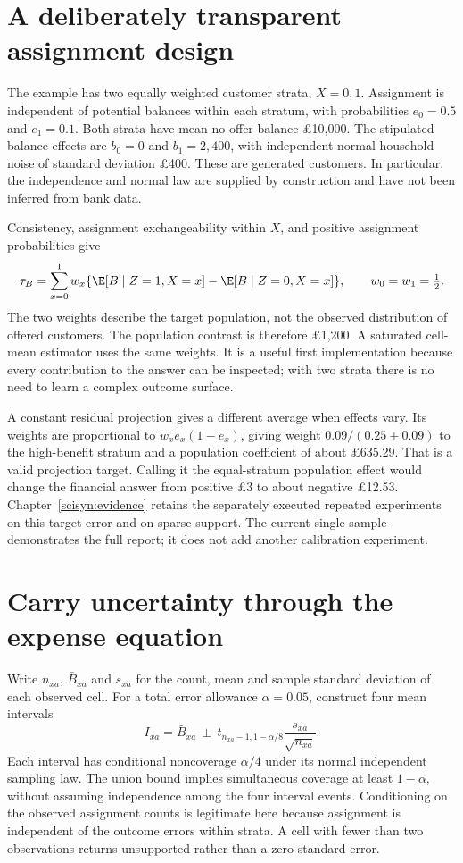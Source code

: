 \section{A deliberately transparent assignment design}
The example has two equally weighted customer strata, $X=0,1$. Assignment is
independent of potential balances within each stratum, with probabilities
$e_0=0.5$ and $e_1=0.1$. Both strata have mean no-offer balance
\pounds10,000. The stipulated balance effects are $b_0=0$ and $b_1=2,400$,
with independent normal household noise of standard deviation \pounds400.
These are generated customers. In particular, the independence and normal
law are supplied by construction and have not been inferred from bank data.

Consistency, assignment exchangeability within $X$, and positive assignment
probabilities give
\[
 \tau_B=\sum_{x=0}^1 w_x
   \{\E[B\mid Z=1,X=x]-\E[B\mid Z=0,X=x]\},
 \qquad w_0=w_1=\tfrac12.
\]
The two weights describe the target population, not the observed distribution
of offered customers. The population contrast is therefore \pounds1,200.
A saturated cell-mean estimator uses the same weights. It is a useful first
implementation because every contribution to the answer can be inspected;
with two strata there is no need to learn a complex outcome surface.

A constant residual projection gives a different average when effects vary.
Its weights are proportional to $w_xe_x(1-e_x)$, giving weight
$0.09/(0.25+0.09)$ to the high-benefit stratum and a population coefficient
of about \pounds635.29. That is a valid projection target. Calling it the
equal-stratum population effect would change the financial answer from
positive \pounds3 to about negative \pounds12.53. Chapter~\ref{scisyn:evidence}
retains the separately executed repeated experiments on this target error
and on sparse support. The current single sample demonstrates the full report;
it does not add another calibration experiment.

\section{Carry uncertainty through the expense equation}
Write $n_{xa}$, $\bar B_{xa}$ and $s_{xa}$ for the count, mean and sample
standard deviation of each observed cell. For a total error allowance
$\alpha=0.05$, construct four mean intervals
\[
 I_{xa}=\bar B_{xa}\ \pm\
 t_{n_{xa}-1,1-\alpha/8}\frac{s_{xa}}{\sqrt{n_{xa}}}.
\]
Each interval has conditional noncoverage $\alpha/4$ under its normal
independent sampling law. The union bound implies simultaneous coverage
at least $1-\alpha$, without assuming independence among the four interval
events. Conditioning on the observed assignment counts is legitimate here
because assignment is independent of the outcome errors within strata.
A cell with fewer than two observations returns unsupported rather than a
zero standard error.

